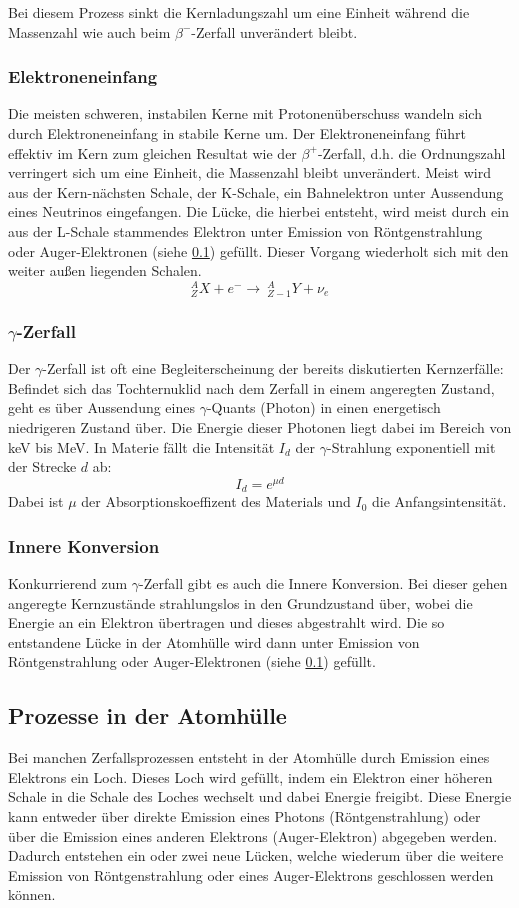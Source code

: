 \documentclass[12pt,listof=totoc]{scrartcl}
\begin{document}
Bei diesem Prozess sinkt die Kernladungszahl um eine Einheit während die Massenzahl wie auch beim $\beta^-$-Zerfall unverändert bleibt.

\subsubsection{Elektroneneinfang}
Die meisten schweren, instabilen Kerne mit Protonenüberschuss wandeln sich durch Elektroneneinfang in stabile Kerne um.
Der Elektroneneinfang führt effektiv im Kern zum gleichen Resultat wie der $\beta^+$-Zerfall, d.h. die Ordnungszahl verringert sich um eine Einheit, die Massenzahl bleibt unverändert. Meist wird aus der Kern-nächsten Schale, der K-Schale, ein Bahnelektron unter Aussendung eines Neutrinos eingefangen. Die Lücke, die hierbei entsteht, wird meist durch ein aus der L-Schale stammendes Elektron unter Emission von Röntgenstrahlung oder Auger-Elektronen (siehe \ref{auger}) gefüllt. Dieser Vorgang wiederholt sich mit den weiter außen liegenden Schalen.
\[{}_Z^A X + e^- \rightarrow\ {}_{Z-1}^A Y + \nu_e\]
\subsubsection{$\gamma$-Zerfall}

Der $\gamma$-Zerfall ist oft eine Begleiterscheinung der bereits diskutierten Kernzerfälle: Befindet sich das Tochternuklid nach dem Zerfall in einem angeregten Zustand, geht es über Aussendung eines $\gamma$-Quants (Photon)  in einen energetisch niedrigeren Zustand über. Die Energie dieser Photonen liegt dabei im Bereich von keV bis MeV. In Materie fällt die Intensität $I_d$ der $\gamma$-Strahlung exponentiell mit der Strecke $d$ ab:
\[I_d=e^{\mu d}\]
Dabei ist $\mu$ der Absorptionskoeffizent des Materials und $I_0$ die Anfangsintensität.

\subsubsection{Innere Konversion}
Konkurrierend zum $\gamma$-Zerfall gibt es auch die Innere Konversion. Bei dieser gehen angeregte Kernzustände strahlungslos in den Grundzustand über, wobei die Energie an ein Elektron übertragen und dieses abgestrahlt wird. Die so entstandene Lücke in der Atomhülle wird dann unter Emission von Röntgenstrahlung oder Auger-Elektronen (siehe \ref{auger}) gefüllt.

\subsection{Prozesse in der Atomhülle}\label{auger}
Bei manchen Zerfallsprozessen entsteht in der Atomhülle durch Emission eines Elektrons ein Loch. Dieses Loch wird gefüllt, indem ein Elektron einer höheren Schale in die Schale des Loches wechselt und dabei Energie freigibt. Diese Energie kann entweder über direkte Emission eines Photons (Röntgenstrahlung) oder über die Emission eines anderen Elektrons (Auger-Elektron) abgegeben werden. Dadurch entstehen ein oder zwei neue Lücken, welche wiederum über die weitere Emission von Röntgenstrahlung oder eines Auger-Elektrons geschlossen werden können.
\end{document}
